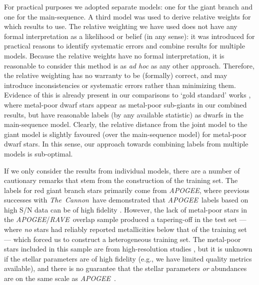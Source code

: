 \documentclass[preprint,trackchanges]{aastex}
\newcommand{\acronym}[1]{{\small{#1}}}
\newcommand{\project}[1]{\textsl{#1}}
\newcommand{\thecannon}{\project{The~Cannon}}
\newcommand{\rave}{\project{\acronym{RAVE}}}
\newcommand{\apogee}{\project{\acronym{APOGEE}}}
\begin{document}
For practical purposes we adopted separate models: one for the giant branch and one
for the main-sequence.  A third model was used to derive relative weights for which
results to use.  The relative weighting we have used does not have any formal
interpretation as a likelihood or belief (in any sense): it was introduced for
practical reasons to identify systematic errors and combine results for multiple
models.  Because the relative weights have no formal interpretation, it is reasonable
to consider this method is as \emph{ad hoc} as any other approach.  Therefore, the
relative weighting has no warranty to be (formally) correct, and may introduce 
inconsistencies or systematic errors rather than
minimizing them.  Evidence of this is already present in our comparisons to
`gold standard' works \citep{Bensby_2014,Reddy_2003,Reddy_2006,Valenti_Fischer_2005},
where metal-poor dwarf stars appear as metal-poor sub-giants in our combined results,
but have reasonable labels (by any available statistic) as dwarfs in the main-sequence
model.  Clearly, the relative distance from the joint model to the giant model is 
slightly favoured (over the main-sequence model) for metal-poor dwarf stars. In this
sense, our approach towards combining labels from multiple models is sub-optimal.


If we only consider the results from individual models, there are a number of cautionary
remarks that stem from the construction of the training set.  The labels for red giant 
branch stars primarily come from \apogee, where previous successes with \thecannon\
have demonstrated that \apogee\ labels based on high S/N data can be of high fidelity
\citep{Ness_2015,Ness_2016,Ho_2016,Casey_2016}.
However, the lack of metal-poor stars in the \apogee/\rave\ overlap sample produced
a tapering-off in the test set --- where \emph{no} stars had reliably reported metallicities
below that of the training set --- which forced us to construct a heterogeneous training
set.  The metal-poor stars included in this sample are from high-resolution studies
\citep{Fulbright_2010,Ruchti_2011}, but it is unknown if the stellar parameters are
of high fidelity (e.g., we have limited quality metrics available), and there is no
guarantee that the stellar parameters \emph{or} abundances are on the same scale as
\apogee\ \citep[and good reasons to believe they will not be; see][]{Smiljanic_2014}.
\end{document}
